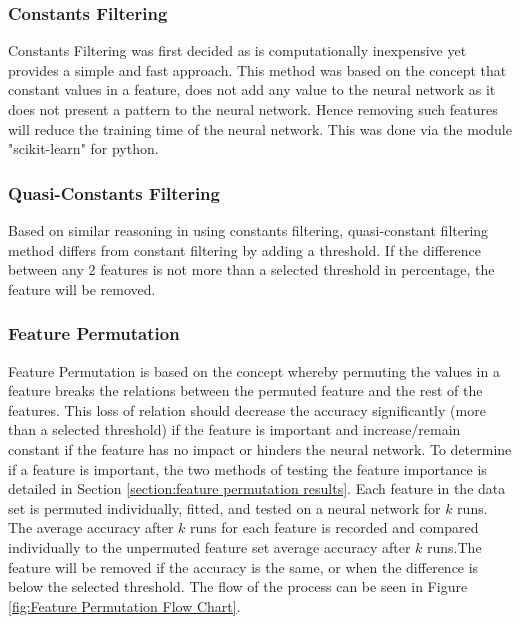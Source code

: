 \documentclass{tum-book}
\begin{document}
        \subsubsection{Constants Filtering}\label{subsubsection:constant filtering}
        Constants Filtering was first decided as is computationally inexpensive yet provides a simple and fast approach. This method was based on the concept that constant values in a feature, does not add any value to the neural network as it does not present a pattern to the neural network. Hence removing such features will reduce the training time of the neural network. This was done via the module "scikit-learn" for python.
        
        \subsubsection{Quasi-Constants Filtering}\label{subsubsection:quasi-constant filtering}
        Based on similar reasoning in using constants filtering, quasi-constant filtering method differs from constant filtering by adding a threshold. If the difference between any 2 features is not more than a selected threshold in percentage, the feature will be removed.
        
        \subsubsection{Feature Permutation}\label{subsubsection:feature permutation}
        Feature Permutation is based on the concept whereby permuting the values in a feature breaks the relations between the permuted feature and the rest of the features. This loss of relation should decrease the accuracy significantly (more than a selected threshold) if the feature is important and increase/remain constant if the feature has no impact or hinders the neural network. To determine if a feature is important, the two methods of testing the feature importance is detailed in Section \ref{section:feature permutation results}. Each feature in the data set is permuted individually, fitted, and tested on a neural network for $k$ runs. The average accuracy after $k$ runs for each feature is recorded and compared individually to the unpermuted feature set average accuracy after $k$ runs.The feature will be removed if the accuracy is the same, or when the difference is below the selected threshold. The flow of the process can be seen in Figure \ref{fig:Feature Permutation Flow Chart}.
        
\end{document}
